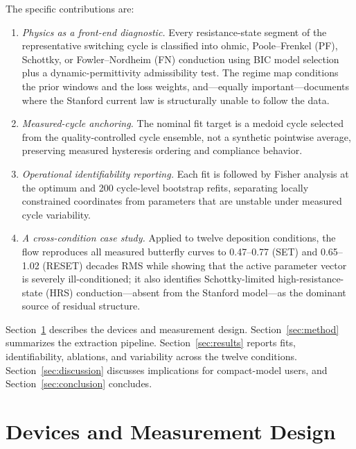\documentclass[journal]{IEEEtran}
\begin{document}
The specific contributions are:
\begin{enumerate}
  \item \emph{Physics as a front-end diagnostic.}  Every resistance-state
        segment of the representative switching cycle is classified into
        ohmic, Poole--Frenkel (PF), Schottky, or Fowler--Nordheim (FN)
        conduction using BIC model selection plus a dynamic-permittivity
        admissibility test.  The regime map conditions the prior windows and
        the loss weights, and---equally important---documents where the
        Stanford current law is structurally unable to follow the data.
  \item \emph{Measured-cycle anchoring.}  The nominal fit target is a medoid
        cycle selected from the quality-controlled cycle ensemble, not a
        synthetic pointwise average, preserving measured hysteresis ordering
        and compliance behavior.
  \item \emph{Operational identifiability reporting.}  Each fit is followed
        by Fisher analysis at the optimum and 200 cycle-level bootstrap
        refits, separating locally constrained coordinates from parameters
        that are unstable under measured cycle variability.
  \item \emph{A cross-condition case study.}  Applied to twelve deposition
        conditions, the flow reproduces all measured butterfly curves to
        0.47--0.77 (SET) and 0.65--1.02 (RESET) decades RMS while showing
        that the active parameter vector is severely ill-conditioned; it
        also identifies Schottky-limited high-resistance-state (HRS)
        conduction---absent from the Stanford model---as the dominant source
        of residual structure.
\end{enumerate}

Section~\ref{sec:devices} describes the devices and measurement design.
Section~\ref{sec:method} summarizes the extraction pipeline.
Section~\ref{sec:results} reports fits, identifiability, ablations, and
variability across the twelve conditions.  Section~\ref{sec:discussion}
discusses implications for compact-model users, and
Section~\ref{sec:conclusion} concludes.

\section{Devices and Measurement Design}
\label{sec:devices}
\end{document}
